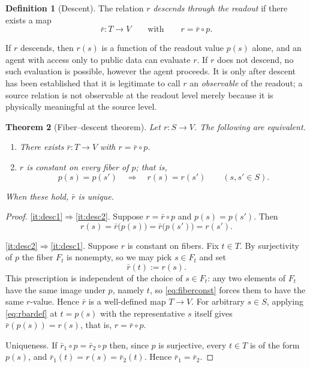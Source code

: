 \documentclass[11pt,reqno]{amsart}
\theoremstyle{plain}
\newtheorem{theorem}{Theorem}[section]
\theoremstyle{definition}
\newtheorem{definition}[theorem]{Definition}
\theoremstyle{remark}
\begin{document}
\begin{definition}[Descent]
\label{def:descent}
The relation $r$ \emph{descends through the readout} if there exists a map
\begin{equation}
\label{eq:rbar}
\bar r\colon T\longrightarrow V
\qquad\text{with}\qquad
r=\bar r\circ p .
\end{equation}
\end{definition}

If $r$ descends, then $r(s)$ is a function of the readout value $p(s)$ alone, and an agent with access only to public data can evaluate $r$. If $r$ does not descend, no such evaluation is possible, however the agent proceeds. It is only after descent has been established that it is legitimate to call $r$ an \emph{observable} of the readout; a source relation is not observable at the readout level merely because it is physically meaningful at the source level.

\begin{theorem}[Fiber--descent theorem]
\label{thm:descent}
Let $r\colon S\to V$. The following are equivalent.
\begin{enumerate}
\item\label{it:desc1} There exists $\bar r\colon T\to V$ with $r=\bar r\circ p$.
\item\label{it:desc2} $r$ is constant on every fiber of $p$; that is,
\begin{equation}
\label{eq:fiberconst}
p(s)=p(s')
\quad\Longrightarrow\quad
r(s)=r(s')
\qquad (s,s'\in S).
\end{equation}
\end{enumerate}
When these hold, $\bar r$ is unique.
\end{theorem}

\begin{proof}
\ref{it:desc1}$\Rightarrow$\ref{it:desc2}. Suppose $r=\bar r\circ p$ and $p(s)=p(s')$. Then
\[
r(s)=\bar r\bigl(p(s)\bigr)=\bar r\bigl(p(s')\bigr)=r(s').
\]

\ref{it:desc2}$\Rightarrow$\ref{it:desc1}. Suppose $r$ is constant on fibers. Fix $t\in T$. By surjectivity of $p$ the fiber $F_{t}$ is nonempty, so we may pick $s\in F_{t}$ and set
\begin{equation}
\label{eq:rbardef}
\bar r(t):=r(s).
\end{equation}
This prescription is independent of the choice of $s\in F_{t}$: any two elements of $F_{t}$ have the same image under $p$, namely $t$, so \eqref{eq:fiberconst} forces them to have the same $r$-value. Hence $\bar r$ is a well-defined map $T\to V$. For arbitrary $s\in S$, applying \eqref{eq:rbardef} at $t=p(s)$ with the representative $s$ itself gives $\bar r(p(s))=r(s)$, that is, $r=\bar r\circ p$.

Uniqueness. If $\bar r_{1}\circ p=\bar r_{2}\circ p$ then, since $p$ is surjective, every $t\in T$ is of the form $p(s)$, and $\bar r_{1}(t)=r(s)=\bar r_{2}(t)$. Hence $\bar r_{1}=\bar r_{2}$.
\end{proof}
\end{document}
